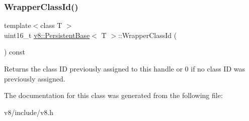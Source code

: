 \subsubsection{\texorpdfstring{Wrapper\+Class\+Id()}{WrapperClassId()}}
{\footnotesize\ttfamily template$<$class T $>$ \\
uint16\+\_\+t \mbox{\hyperlink{classv8_1_1PersistentBase}{v8\+::\+Persistent\+Base}}$<$ T $>$\+::Wrapper\+Class\+Id (\begin{DoxyParamCaption}{ }\end{DoxyParamCaption}) const}

Returns the class ID previously assigned to this handle or 0 if no class ID was previously assigned. 

The documentation for this class was generated from the following file\+:\begin{DoxyCompactItemize}
\item 
v8/include/v8.\+h\end{DoxyCompactItemize}
